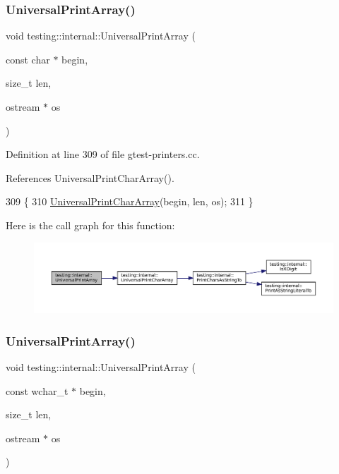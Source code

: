 \subsubsection{\texorpdfstring{Universal\+Print\+Array()}{UniversalPrintArray()}\hspace{0.1cm}{\footnotesize\ttfamily [1/5]}}
{\footnotesize\ttfamily void testing\+::internal\+::\+Universal\+Print\+Array (\begin{DoxyParamCaption}\item[{const char $\ast$}]{begin,  }\item[{size\+\_\+t}]{len,  }\item[{ostream $\ast$}]{os }\end{DoxyParamCaption})}



Definition at line 309 of file gtest-\/printers.\+cc.



References Universal\+Print\+Char\+Array().


\begin{DoxyCode}
309                                                                      \{
310   \hyperlink{namespacetesting_1_1internal_ad896a4e4d9133ce43dc18b6038d95dc3}{UniversalPrintCharArray}(begin, len, os);
311 \}
\end{DoxyCode}
Here is the call graph for this function\+:
\nopagebreak
\begin{figure}[H]
\begin{center}
\leavevmode
\includegraphics[width=350pt]{namespacetesting_1_1internal_a070107e7a8205ad6ec4d538d52b15b38_cgraph}
\end{center}
\end{figure}
\mbox{\label{namespacetesting_1_1internal_a52394019018eb5079f9f1bcca23dcd60}} 
\subsubsection{\texorpdfstring{Universal\+Print\+Array()}{UniversalPrintArray()}\hspace{0.1cm}{\footnotesize\ttfamily [2/5]}}
{\footnotesize\ttfamily void testing\+::internal\+::\+Universal\+Print\+Array (\begin{DoxyParamCaption}\item[{const wchar\+\_\+t $\ast$}]{begin,  }\item[{size\+\_\+t}]{len,  }\item[{ostream $\ast$}]{os }\end{DoxyParamCaption})}



